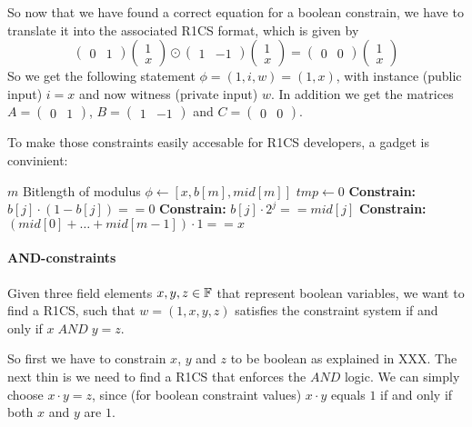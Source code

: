 So now that we have found a correct equation for a boolean constrain, we have to translate it into the associated R1CS format, which is given by 
$$
\begin{pmatrix}0 & 1 \end{pmatrix} \begin{pmatrix} 1 \\ x \end{pmatrix}\odot
\begin{pmatrix}1 & -1 \end{pmatrix} \begin{pmatrix} 1 \\ x \end{pmatrix} =
\begin{pmatrix}0 & 0 \end{pmatrix} \begin{pmatrix} 1 \\ x \end{pmatrix}
$$
So we get the following statement $\phi = (1,i,w) = (1, x)$, with instance (public input) $i=x$ and now witness (private input) $w$. In addition we get the matrices
$A=\begin{pmatrix}0 & 1\end{pmatrix}$, $B=\begin{pmatrix}1 & -1\end{pmatrix}$ and $C=\begin{pmatrix}0 & 0\end{pmatrix}$.

To make those constraints easily accesable for R1CS developers, a gadget is convinient:
\begin{algorithmic}
\Require $m$ Bitlength of modulus
\Statement $\phi \gets [x,b[m],mid[m]]$
\State $tmp \gets 0$
	\State \textbf{Constrain:} $b[j]\cdot (1-b[j]) == 0$
	\State \textbf{Constrain:} $b[j] \cdot 2^j == mid[j]$
\EndFor
\State \textbf{Constrain:} $(mid[0]+\ldots+mid[m-1])\cdot 1 == x$
\end{algorithmic}
   

\paragraph{AND-constraints} Given three field elements $x,y,z\in\mathbb{F}$ that represent boolean variables, we want to find a R1CS, such that $w=(1,x,y,z)$ satisfies the constraint system if and only if $x\; AND \; y =z$. 

So first we have to constrain $x$, $y$ and $z$ to be boolean as explained in XXX. The next thin is we need to find a R1CS that enforces the $AND$ logic. We can simply choose $x\cdot y =z$, since (for boolean constraint values) $x\cdot y$ equals $1$ if and only if both $x$ and $y$ are $1$.  

